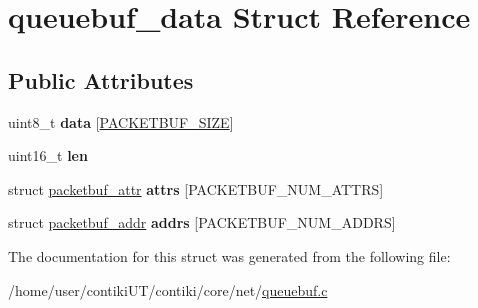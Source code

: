\hypertarget{structqueuebuf__data}{}\section{queuebuf\+\_\+data Struct Reference}
\label{structqueuebuf__data}
\subsection*{Public Attributes}
\begin{DoxyCompactItemize}
\item 
\hypertarget{structqueuebuf__data_ad00ac1d293b08bdbdc30719df6a39ef4}{}uint8\+\_\+t {\bfseries data} \mbox{[}\hyperlink{group__packetbuf_ga7a3b189fd04b82463abb4117fdb26b67}{P\+A\+C\+K\+E\+T\+B\+U\+F\+\_\+\+S\+I\+Z\+E}\mbox{]}\label{structqueuebuf__data_ad00ac1d293b08bdbdc30719df6a39ef4}

\item 
\hypertarget{structqueuebuf__data_ae393adfce74d48746a6b708dee36ec78}{}uint16\+\_\+t {\bfseries len}\label{structqueuebuf__data_ae393adfce74d48746a6b708dee36ec78}

\item 
\hypertarget{structqueuebuf__data_a302084e076bf690992b2ccb760ea6bac}{}struct \hyperlink{structpacketbuf__attr}{packetbuf\+\_\+attr} {\bfseries attrs} \mbox{[}P\+A\+C\+K\+E\+T\+B\+U\+F\+\_\+\+N\+U\+M\+\_\+\+A\+T\+T\+R\+S\mbox{]}\label{structqueuebuf__data_a302084e076bf690992b2ccb760ea6bac}

\item 
\hypertarget{structqueuebuf__data_a6c3a408d7ca7d76e1d6749ecb20c1b8b}{}struct \hyperlink{structpacketbuf__addr}{packetbuf\+\_\+addr} {\bfseries addrs} \mbox{[}P\+A\+C\+K\+E\+T\+B\+U\+F\+\_\+\+N\+U\+M\+\_\+\+A\+D\+D\+R\+S\mbox{]}\label{structqueuebuf__data_a6c3a408d7ca7d76e1d6749ecb20c1b8b}

\end{DoxyCompactItemize}


The documentation for this struct was generated from the following file\+:\begin{DoxyCompactItemize}
\item 
/home/user/contiki\+U\+T/contiki/core/net/\hyperlink{queuebuf_8c}{queuebuf.\+c}\end{DoxyCompactItemize}
